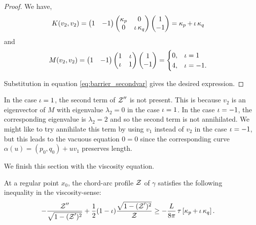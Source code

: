 \documentclass[11pt]{amsart}
\begin{document}
\begin{proof}
We have,
\[
K(v_2, v_2) =
\begin{pmatrix}
1 & -1
\end{pmatrix}
\begin{pmatrix}
\operatorname{\kappa}_{p} & 0 \\
0 & \operatorname{\iota} \operatorname{\kappa}_{q}
\end{pmatrix}
\begin{pmatrix}
1 \\
-1
\end{pmatrix}
= \operatorname{\kappa}_p + \operatorname{\iota} \operatorname{\kappa}_q
\]
and
\[
M(v_2, v_2) = \begin{pmatrix}
1 & -1
\end{pmatrix}
\begin{pmatrix}
1 & \operatorname{\iota} \\
\operatorname{\iota} & 1
\end{pmatrix}
\begin{pmatrix}
1 \\
-1
\end{pmatrix}
= \begin{cases}
0, & \operatorname{\iota} = 1 \\
4, & \operatorname{\iota} = -1.
\end{cases}
\]

Substitution in equation \eqref{eq:barrier_secondvar} gives the desired expression.
\end{proof}

\begin{remark}
In the case \(\operatorname{\iota} = 1\), the second term of \(\operatorname{\mathcal{Z}}''\) is not present. This is because \(v_2\) is an eigenvector of \(M\) with eigenvalue \(\lambda_2 = 0\) in the case \(\operatorname{\iota} = 1\). In the case \(\operatorname{\iota} = -1\), the corresponding eigenvalue is \(\lambda_2 = 2\) and so the second term is not annihilated. We might like to try annihilate this term by using \(v_1\) instead of \(v_2\) in the case \(\operatorname{\iota} = -1\), but this leads to the vacuous equation \(0 = 0\) since the corresponding curve \(\alpha(u) = (p_0, q_0) + u v_1\) preserves length.
\end{remark}

We finish this section with the viscosity equation.

\begin{theorem}
\label{thm:spatial_viscosity}
At a regular point \(x_0\), the chord-arc profile $\operatorname{\mathcal{Z}}$ of \(\gamma\) satisfies the following inequality in the viscosity-sense:
\[
-\frac{\operatorname{\mathcal{Z}}''}{\sqrt{1-(\operatorname{\mathcal{Z}}')^2}} + \frac{1}{2} (1-\operatorname{\iota}) \frac{\sqrt{1 - (\operatorname{\mathcal{Z}}')^2}}{\operatorname{\mathcal{Z}}} \geq -\frac{L}{8\pi} \operatorname{\tau} \left[\operatorname{\kappa}_p + \operatorname{\iota} \operatorname{\kappa}_q\right].
\]
\end{theorem}
\end{document}
